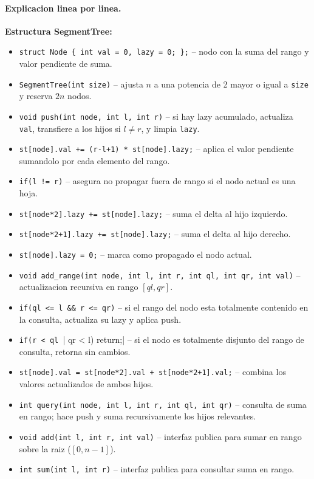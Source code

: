 \paragraph{Explicacion linea por linea.}
\textbf{Estructura SegmentTree:}
\begin{itemize}\setlength\itemsep{0pt}
	\item \verb|struct Node { int val = 0, lazy = 0; };| -- nodo con la suma del rango y valor pendiente de suma.
	\item \verb|SegmentTree(int size)| -- ajusta $n$ a una potencia de 2 mayor o igual a \texttt{size} y reserva $2n$ nodos.
	\item \verb|void push(int node, int l, int r)| -- si hay lazy acumulado, actualiza \texttt{val}, transfiere a los hijos si $l \ne r$, y limpia \texttt{lazy}.
	\item \verb|st[node].val += (r-l+1) * st[node].lazy;| -- aplica el valor pendiente sumandolo por cada elemento del rango.
	\item \verb|if(l != r)| -- asegura no propagar fuera de rango si el nodo actual es una hoja.
	\item \verb|st[node*2].lazy += st[node].lazy;| -- suma el delta al hijo izquierdo.
	\item \verb|st[node*2+1].lazy += st[node].lazy;| -- suma el delta al hijo derecho.
	\item \verb|st[node].lazy = 0;| -- marca como propagado el nodo actual.
	\item \verb|void add_range(int node, int l, int r, int ql, int qr, int val)| -- actualizacion recursiva en rango $[ql, qr]$.
	\item \verb|if(ql <= l && r <= qr)| -- si el rango del nodo esta totalmente contenido en la consulta, actualiza su lazy y aplica push.
	\item \verb|if(r < ql || qr < l) return;| -- si el nodo es totalmente disjunto del rango de consulta, retorna sin cambios.
	\item \verb|st[node].val = st[node*2].val + st[node*2+1].val;| -- combina los valores actualizados de ambos hijos.
	\item \verb|int query(int node, int l, int r, int ql, int qr)| -- consulta de suma en rango; hace push y suma recursivamente los hijos relevantes.
	\item \verb|void add(int l, int r, int val)| -- interfaz publica para sumar en rango sobre la raiz ($[0, n-1]$).
	\item \verb|int sum(int l, int r)| -- interfaz publica para consultar suma en rango.
\end{itemize}
